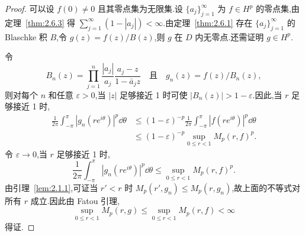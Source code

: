\begin{proof}
可以设 $f(0) \neq 0$ 且其零点集为无限集.设 $\{a_{j}\}_{j=1}^{\infty}$ 为 $f \in H^{p}$ 的零点集,由定理~\ref{thm:2.6.3} 得 $\sum_{j=1}^{\infty}(1 - |a_{j}|) < \infty$.由定理~\ref{thm:2.6.1} 存在 $\{a_{j}\}_{j=1}^{\infty}$ 的 Blaschke 积 $B$,令 $g(z) = f(z)/B(z)$,则 $g$ 在 $D$ 内无零点.还需证明 $g \in H^{p}$.

令
\begin{equation*}
B_{n}(z) = \prod_{j = 1}^{n}\frac{|a_{j}|}{a_{j}}\frac{a_{j} - z}{1 - \bar{a}_{j}z} \quad \text{且} \quad g_{n}(z) = f(z)/B_{n}(z),
\end{equation*}
则对每个 $n$ 和任意 $\varepsilon > 0$,当 $|z|$ 足够接近 1 时可使 $|B_{n}(z)| > 1 - \varepsilon$.因此,当 $r$ 足够接近 1 时,
\begin{align*}
\frac{1}{2\pi}\int_{-\pi}^{\pi}|g_{n}(re^{i\theta})|^{p}\dd\theta & \leq (1 - \varepsilon)^{-p}\frac{1}{2\pi}\int_{-\pi}^{\pi}|f(re^{i\theta})|^{p}\dd\theta \\
& \leq (1 - \varepsilon)^{-p}\sup_{0 \leq r < 1}M_{p}(r, f)^{p}.
\end{align*}
令 $\varepsilon \to 0$,当 $r$ 足够接近 1 时,
\begin{equation*}
\frac{1}{2\pi}\int_{-\pi}^{\pi}|g_{n}(re^{i\theta})|^{p}\dd\theta \leq \sup_{0 \leq r < 1}M_{p}(r, f)^{p}.
\end{equation*}
由引理~\ref{lem:2.1.1},可证当 $r' < r$ 时 $M_{p}(r', g_{n}) \leq M_{p}(r, g_{n})$,故上面的不等式对所有 $r$ 成立.因此由 Fatou 引理,
\begin{equation*}
\sup_{0 \leq r < 1}M_{p}(r, g) \leq \sup_{0 \leq r < 1}M_{p}(r, f) < \infty
\end{equation*}
得证.
\end{proof}
